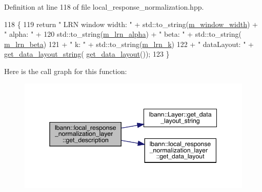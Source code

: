 Definition at line 118 of file local\+\_\+response\+\_\+normalization.\+hpp.


\begin{DoxyCode}
118                                              \{
119     \textcolor{keywordflow}{return} \textcolor{stringliteral}{" LRN window width: "} + std::to\_string(\hyperlink{classlbann_1_1local__response__normalization__layer_a4914619a19eb43efcf8240b8a1e0c090}{m\_window\_width}) + \textcolor{stringliteral}{" alpha: "} +
120       std::to\_string(\hyperlink{classlbann_1_1local__response__normalization__layer_a85c25a68888e2e9d163a820326fc09ff}{m\_lrn\_alpha}) + \textcolor{stringliteral}{" beta: "} + std::to\_string(
      \hyperlink{classlbann_1_1local__response__normalization__layer_ad06848e9d59664be86aecbc1e2ba556f}{m\_lrn\_beta})
121       + \textcolor{stringliteral}{" k: "} + std::to\_string(\hyperlink{classlbann_1_1local__response__normalization__layer_a896f875d6f6a763c1cb0dbd43679164e}{m\_lrn\_k})
122       + \textcolor{stringliteral}{" dataLayout: "} + \hyperlink{classlbann_1_1Layer_ae3f4a5602df821f4221614b1e3782dc1}{get\_data\_layout\_string}(
      \hyperlink{classlbann_1_1local__response__normalization__layer_a7a161dde860f17264077a0cc4797fe36}{get\_data\_layout}());
123   \}
\end{DoxyCode}
Here is the call graph for this function\+:\nopagebreak
\begin{figure}[H]
\begin{center}
\leavevmode
\includegraphics[width=345pt]{classlbann_1_1local__response__normalization__layer_a31f4ab1700e2e1c69a0ccb44c6f0fd69_cgraph}
\end{center}
\end{figure}
\mbox{\label{classlbann_1_1local__response__normalization__layer_ad566e7894d7eb1eb0fd1560686bf2388}} 
